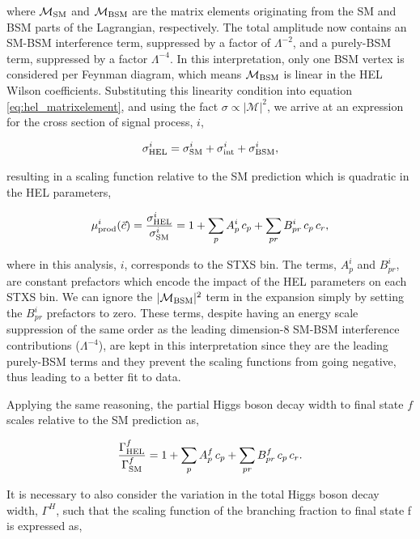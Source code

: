\noindent
where $\mathcal{M}_{\rm{SM}}$ and $\mathcal{M}_{\rm{BSM}}$ are the matrix elements originating from the SM and BSM parts of the Lagrangian, respectively. The total amplitude now contains an SM-BSM interference term, suppressed by a factor of $\Lambda^{-2}$, and a purely-BSM term, suppressed by a factor $\Lambda^{-4}$. In this interpretation, only one BSM vertex is considered per Feynman diagram, which means $\mathcal{M}_{\rm{BSM}}$ is linear in the HEL Wilson coefficients. Substituting this linearity condition into equation \ref{eq:hel_matrixelement}, and using the fact $\sigma \propto |\mathcal{M}|^2$, we arrive at an expression for the cross section of signal process, $i$,

\begin{equation}
    \sigma^i_{\rm{HEL}} = \sigma^i_{\rm{SM}} + \sigma^i_{\rm{int}} + \sigma^i_{\rm{BSM}},
\end{equation}

\noindent
resulting in a scaling function relative to the SM prediction which is quadratic in the HEL parameters,

\begin{equation}\label{eq:xs_scaling_functions}
    \mu^i_{\rm{prod}}(\vec{c}) = \frac{\sigma^i_{\rm{HEL}}}{\sigma^i_{\rm{SM}}} = 1 + \sum_p A^i_p\,c_p + \sum_{pr} B^i_{pr}\,c_p\,c_r,
\end{equation}

\noindent
where in this analysis, $i$, corresponds to the STXS bin. The terms, $A^i_p$ and $B^i_{pr}$, are constant prefactors which encode the impact of the HEL parameters on each STXS bin. We can ignore the $|\mathcal{M}_{\rm{BSM}}|^2$ term in the expansion simply by setting the $B^i_{pr}$ prefactors to zero. These terms, despite having an energy scale suppression of the same order as the leading dimension-8 SM-BSM interference contributions ($\Lambda^{-4}$), are kept in this interpretation since they are the leading purely-BSM terms and they prevent the scaling functions from going negative, thus leading to a better fit to data.

Applying the same reasoning, the partial Higgs boson decay width to final state $f$ scales relative to the SM prediction as,

\begin{equation}
    \frac{\Gamma^f_{\rm{HEL}}}{\Gamma^f_{\rm{SM}}} = 1 + \sum_p A^f_p\,c_p + \sum_{pr} B^f_{pr}\,c_p\,c_r.
\end{equation}

\noindent
It is necessary to also consider the variation in the total Higgs boson decay width, $\Gamma^H$, such that the scaling function of the branching fraction to final state f is expressed as,

